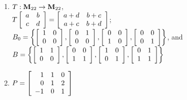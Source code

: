 \begin{multicols}{2}
\begin{ex}
\begin{enumerate}[label={\alph*.}]
\item $T : \textbf{M}_{22} \to \textbf{M}_{22}$, \\ $T\left[ \begin{array}{cc} a & b \\ c & d \end{array} \right] = \left[ \begin{array}{cc} a + d & b + c \\ a + c & b + d \end{array} \right]$; \\ \hspace*{-2em}$B_0 = \left\{ \left[ \begin{array}{rr} 1 & 0 \\ 0 & 0 \end{array} \right], \left[ \begin{array}{rr} 0 & 1 \\ 0 & 0 \end{array} \right], \left[ \begin{array}{rr} 0 & 0 \\ 1 & 0 \end{array} \right], \left[ \begin{array}{rr} 0 & 0 \\ 0 & 1 \end{array} \right] \right\}$, and \\ \hspace*{-2em}$B = \left\{ \left[ \begin{array}{rr} 1 & 1 \\ 0 & 0 \end{array} \right], \left[ \begin{array}{rr} 0 & 0 \\ 1 & 1 \end{array} \right], \left[ \begin{array}{rr} 1 & 0 \\ 0 & 1 \end{array} \right], \left[ \begin{array}{rr} 0 & 1 \\ 1 & 1 \end{array} \right] \right\}$
\end{enumerate}
\begin{sol}
\begin{enumerate}[label={\alph*.}]
\setcounter{enumi}{1}
\item $P = \left[ \begin{array}{rrr} 1 & 1 & 0 \\ 0 & 1 & 2 \\ -1 & 0 & 1 \end{array} \right]$



\end{enumerate}
\end{sol}
\end{ex}
\end{multicols}
